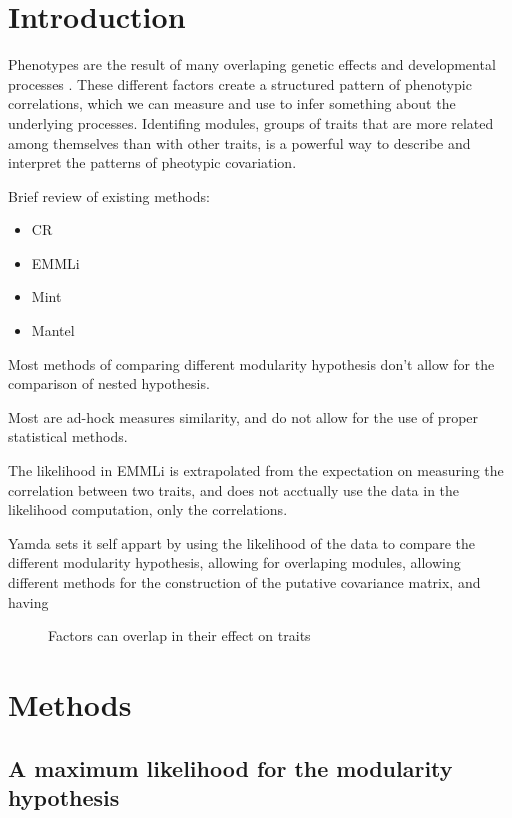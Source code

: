 \section*{Introduction}

Phenotypes are the result of many overlaping genetic effects and developmental
processes \citep{Lande1983-ez,Klingenberg2008-ll,Melo2016-yw}. These different
factors create a structured pattern of phenotypic correlations, which we can
measure and use to infer something about the underlying processes. Identifing
modules, groups of traits that are more related among themselves than with other
traits, is a powerful way to describe and interpret the patterns of pheotypic
covariation.

Brief review of existing methods:

\begin{itemize}
    \item CR    
    \item EMMLi
    \item Mint
    \item Mantel
\end{itemize}

Most methods of comparing different modularity hypothesis don't allow for the
comparison of nested hypothesis. 

Most are ad-hock measures similarity, and do
not allow for the use of proper statistical methods. 

The likelihood in EMMLi is
extrapolated from the expectation on measuring the correlation between two
traits, and does not acctually use the data in the likelihood computation, only
the correlations. 

Yamda sets it self appart by using the likelihood of the data to compare the
different modularity hypothesis, allowing for overlaping modules, allowing
different methods for the construction of the putative covariance matrix, and
having 


\begin{figure}[h]
    \center
    
\caption[Factors and modules]{ Factors can overlap in their effect on traits }
\label{fig:factor-diagram}
\end{figure} 

\section*{Methods}


\subsection*{A maximum likelihood for the modularity hypothesis}

